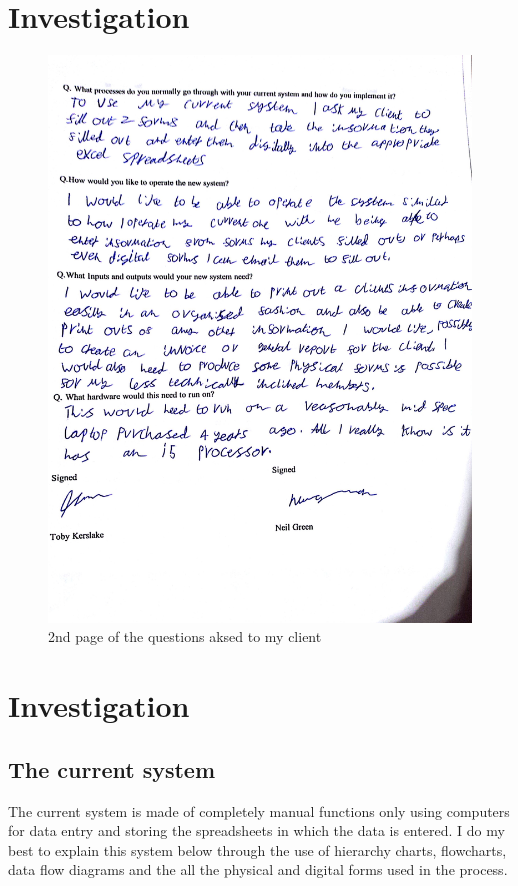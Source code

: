 \section{Investigation}

\begin{figure}[H]
    \includegraphics[width=\textwidth]{Questionaire 2.jpg}
    \caption{2nd page of the questions aksed to my client} \label{fig:2nd page of the questions aksed to my clien}
\end{figure}
\section{Investigation}

\subsection{The current system}

The current system is made of completely manual functions only using computers for data entry and storing the spreadsheets in which the data is entered. I do my best to explain this system below through the use of hierarchy charts, flowcharts, data flow diagrams and the all the physical and digital forms used in the process.

